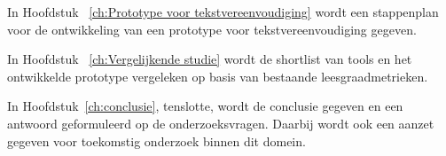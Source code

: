 In Hoofdstuk ~\ref{ch:Prototype voor tekstvereenvoudiging} wordt een stappenplan voor de ontwikkeling van een prototype voor tekstvereenvoudiging gegeven.

In Hoofdstuk ~\ref{ch:Vergelijkende studie} wordt de shortlist van tools en het ontwikkelde prototype vergeleken op basis van bestaande leesgraadmetrieken.

In Hoofdstuk~\ref{ch:conclusie}, tenslotte, wordt de conclusie gegeven en een antwoord geformuleerd op de onderzoeksvragen. Daarbij wordt ook een aanzet gegeven voor toekomstig onderzoek binnen dit domein.
